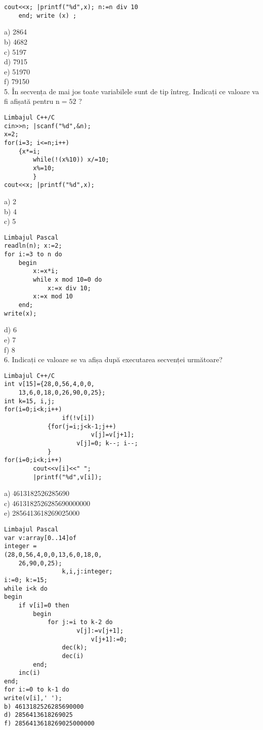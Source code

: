 \begin{verbatim}
cout<<x; |printf("%d",x); n:=n div 10
    end; write (x) ;
\end{verbatim}

a) 2864\\
b) 4682\\
c) 5197\\
d) 7915\\
e) 51970\\
f) 79150\\
5. În secvența de mai jos toate variabilele sunt de tip întreg. Indicați ce valoare va fi afișată pentru $\mathrm{n}=52$ ?

\begin{verbatim}
Limbajul C++/C
cin>>n; |scanf("%d",&n);
x=2;
for(i=3; i<=n;i++)
    {x*=i;
        while(!(x%10)) x/=10;
        x%=10;
        }
cout<<x; |printf("%d",x);
\end{verbatim}

a) 2\\
b) 4\\
c) 5

\begin{verbatim}
Limbajul Pascal
readln(n); x:=2;
for i:=3 to n do
    begin
        x:=x*i;
        while x mod 10=0 do
            x:=x div 10;
        x:=x mod 10
    end;
write(x);
\end{verbatim}

d) 6\\
e) 7\\
f) 8\\
6. Indicați ce valoare se va afișa după executarea secvenței următoare?

\begin{verbatim}
Limbajul C++/C
int v[15]={28,0,56,4,0,0,
    13,6,0,18,0,26,90,0,25};
int k=15, i,j;
for(i=0;i<k;i++)
                if(!v[i])
            {for(j=i;j<k-1;j++)
                        v[j]=v[j+1];
                    v[j]=0; k--; i--;
            }
for(i=0;i<k;i++)
        cout<<v[i]<<" ";
        |printf("%d",v[i]);
\end{verbatim}

a) 4613182526285690\\
c) 4613182526285690000000\\
e) 2856413618269025000

\begin{verbatim}
Limbajul Pascal
var v:array[0..14]of
integer =
(28,0,56,4,0,0,13,6,0,18,0,
    26,90,0,25);
                k,i,j:integer;
i:=0; k:=15;
while i<k do
begin
    if v[i]=0 then
        begin
            for j:=i to k-2 do
                    v[j]:=v[j+1];
                        v[j+1]:=0;
                dec(k);
                dec(i)
        end;
    inc(i)
end;
for i:=0 to k-1 do
write(v[i],' ');
b) 4613182526285690000
d) 2856413618269025
f) 2856413618269025000000
\end{verbatim}

